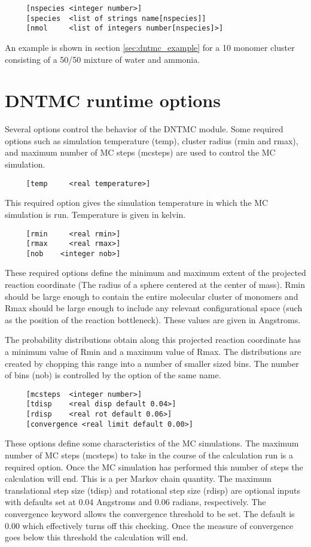 \begin{verbatim}
     [nspecies <integer number>]
     [species  <list of strings name[nspecies]]
     [nmol     <list of integers number[nspecies]>]
\end{verbatim}

An example is shown in section \ref{sec:dntmc_example} for a 10
monomer cluster consisting of a 50/50 mixture of water and ammonia.

\section{DNTMC runtime options}

Several options control the behavior of the DNTMC module.  Some
required options such as simulation temperature (temp), cluster
radius (rmin and rmax), and maximum number of MC steps (mcsteps) are
used to control the MC simulation.

\begin{verbatim}
     [temp     <real temperature>]
\end{verbatim}
This required option gives the simulation temperature in which the
MC simulation is run.  Temperature is given in kelvin.

\begin{verbatim}
     [rmin     <real rmin>]
     [rmax     <real rmax>]
     [nob    <integer nob>]
\end{verbatim}
These required options define the minimum and maximum extent of the
projected reaction coordinate (The radius of a sphere centered at
the center of mass).  Rmin should be large enough to contain the
entire molecular cluster of monomers and Rmax should be large enough
to include any relevant configurational space (such as the position
of the reaction bottleneck).  These values are given in Angstroms.

The probability distributions obtain along this projected reaction
coordinate has a minimum value of Rmin and a maximum value of Rmax.
The distributions are created by chopping this range into a number
of smaller sized bins.  The number of bins (nob) is controlled by
the option of the same name.

\begin{verbatim}
     [mcsteps  <integer number>]
     [tdisp    <real disp default 0.04>]
     [rdisp    <real rot default 0.06>]
     [convergence <real limit default 0.00>]
\end{verbatim}
These options define some characteristics of the MC simulations. The
maximum number of MC steps (mcsteps) to take in the course of the
calculation run is a required option.  Once the MC simulation has
performed this number of steps the calculation will end.  This is a
per Markov chain quantity.  The maximum translational step size
(tdisp) and rotational step size (rdisp) are optional inputs with
defaults set at 0.04 Angstroms and 0.06 radians, respectively.  The
convergence keyword allows the convergence threshold to be set.  The
default is 0.00 which effectively turns off this checking.  Once the
measure of convergence goes below this threshold the calculation
will end.

